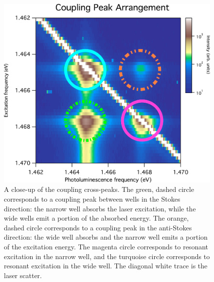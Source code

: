\begin{figure}
\centering
\includegraphics[width = .8\textwidth]{Layouttryit.jpg}
\caption{ \doublespacing A close-up of the coupling cross-peaks. The green, dashed circle corresponds to a coupling peak between wells in the Stokes direction: the narrow well absorbs the laser excitation, while the wide wells emit a portion of the absorbed energy. The orange, dashed circle corresponds to a coupling peak in the anti-Stokes direction: the wide well absorbs and the narrow well emits a portion of the excitation energy. The magenta circle corresponds to resonant excitation in the narrow well, and the turquoise circle corresponds to resonant excitation in the wide well. The diagonal white trace is the laser scatter.}
\label{peakscheme}
\end{figure}

